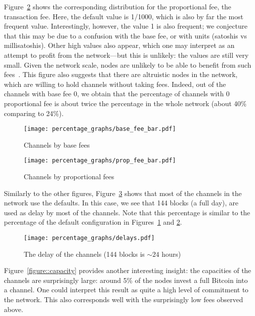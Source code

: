     Figure~\ref{figure::prop_fee} shows the corresponding distribution
    for the proportional fee, the transaction fee.
    Here, the default value is 1/1000, which is also by far the most frequent value.
    Interestingly, however, the value 1 is also frequent; we conjecture that this may be due
    to a confusion with the base fee, or with units (satoshis vs millisatoshis). 
    Other high values also appear, which one may interpret as an attempt to profit from the network---but this is unlikely: the values are still very small. Given the network scale,
    nodes are unlikely to be able to benefit from such fees~\cite{lightning2018paylittle}. This figure also suggests that there are altruistic nodes in the network, which are willing to hold channels without taking fees. Indeed, out of the channels with base fee 0, we obtain that the percentage of channels with 0 proportional fee is about twice the percentage in the whole network (about 40\% comparing to 24\%).
    
        \begin{figure}
    	\centering
    	\texttt{[image: percentage\_graphs/base\_fee\_bar.pdf]}
    	\caption{Channels by base fees}
    	\label{figure::base_fee}
    \end{figure}

    \begin{figure}
    	\centering
    	\texttt{[image: percentage\_graphs/prop\_fee\_bar.pdf]}
    	\caption{Channels by proportional fees}
    	\label{figure::prop_fee}
    \end{figure}
    
    Similarly to the other figures, Figure~\ref{figure::delay} shows that most of the channels in the network use the defaults. In this case, we see that 144 blocks (a full day), are used as delay by most of the channels. Note that this percentage is similar to the percentage of the default configuration in Figures~\ref{figure::base_fee} and \ref{figure::prop_fee}.
    
    \begin{figure} 
    	\centering
    	\texttt{[image: percentage\_graphs/delays.pdf]}
    	\caption{The delay of the channels (144 blocks is $\sim 24$ hours)}
    	\label{figure::delay}
    \end{figure}
    
    

Figure~\ref{figure::capacity} provides another interesting insight:
the capacities of the channels are surprisingly large:
around 5\% of the nodes invest a full Bitcoin into a channel.
One could interpret this result as quite a high level of commitment to the network. This also corresponds well with the
surprisingly low fees observed above. 

